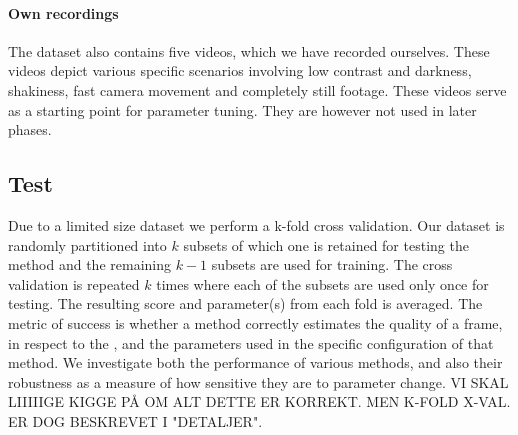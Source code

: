 \paragraph{Own recordings}
%
The dataset also contains five videos, which we have recorded ourselves. These videos depict various specific scenarios involving low contrast and darkness, shakiness, fast camera movement and completely still footage. These videos serve as a starting point for parameter tuning. They are however not used in later phases.
%
\subsection{Test}
%
%
%
Due to a limited size dataset we perform a k-fold cross validation. Our dataset is randomly partitioned into $k$ subsets of which one is retained for testing the method and the remaining $k-1$ subsets are used for training. The cross validation is repeated $k$ times where each of the subsets are used only once for testing. The resulting score and parameter(s) from each fold is averaged. The metric of success is whether a method correctly estimates the quality of a frame, in respect to the , and the parameters used in the specific configuration of that method. We investigate both the performance of various methods, and also their robustness as a measure of how sensitive they are to parameter change. VI SKAL LIIIIIGE KIGGE PÅ OM ALT DETTE ER KORREKT. MEN K-FOLD X-VAL. ER DOG BESKREVET I "DETALJER".
